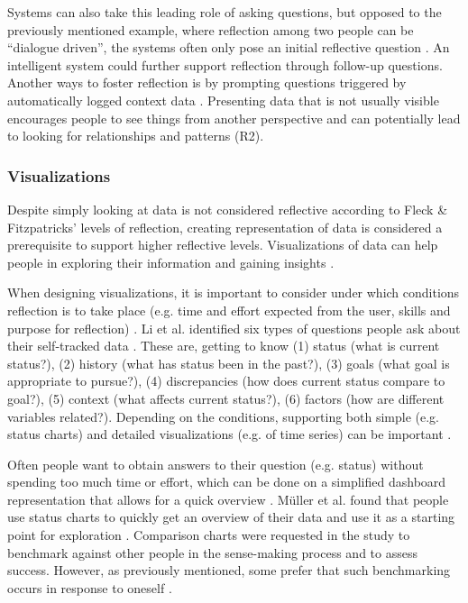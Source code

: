Systems can also take this leading role of asking questions, but opposed to the previously mentioned example, where reflection among two people can be “dialogue driven”, the systems often only pose  an initial reflective question \cite{Mols}. An intelligent system could further support reflection through follow-up questions. Another ways to foster reflection is by prompting questions triggered by automatically logged context data \cite{Fleck}. Presenting data that is not usually visible encourages people to see things from another perspective and can potentially lead to looking for relationships and patterns (R2). 

\subsubsection{Visualizations}
Despite simply looking at data is not considered reflective according to Fleck \& Fitzpatricks’ levels of reflection, creating representation of data is considered a prerequisite to support higher reflective levels. Visualizations of data can help people in exploring their information and gaining insights \cite{Li2010, Choe2014}. 

When designing visualizations, it is important to consider under which conditions reflection is to take place (e.g. time and effort expected from the user, skills and purpose for reflection) \cite{Cuttone, Muller}. Li et al. identified six types of questions people ask about their self-tracked data \cite{Li2011}. These are, getting to know (1) status (what is current status?), (2) history (what has status been in the past?), (3) goals (what goal is appropriate to pursue?), (4) discrepancies (how does current status compare to goal?), (5) context (what affects current status?), (6) factors (how are different variables related?). Depending on the conditions, supporting both simple (e.g. status charts) and detailed visualizations (e.g. of time series) can be important \cite{Muller, Cuttone}.

Often people want to obtain answers to their question (e.g. status) without spending too much time or effort, which can be done on a simplified dashboard representation that allows for a quick overview \cite{Cuttone}. Müller et al. found that people use status charts to quickly get an overview of their data and use it as a starting point for exploration \cite{Muller}. Comparison charts were requested in the study to benchmark against other people in the sense-making process and to assess success. However, as previously mentioned, some prefer that such benchmarking occurs in response to oneself \cite{Ancker2015}. 

